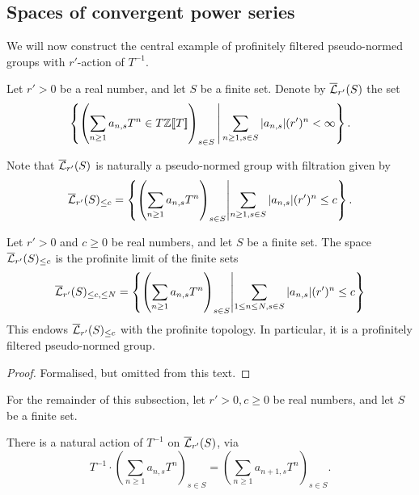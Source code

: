 \subsection{Spaces of convergent power series}

We will now construct the central example of
profinitely filtered pseudo-normed groups with $r'$-action of $T^{-1}$.

\begin{definition}
  \label{Lbar}
  \leanok
  Let $r' > 0$ be a real number, and let $S$ be a finite set.
  Denote by $\overline{\mathcal L}_{r'}(S)$ the set
  \[
    \left\{ \left( \sum_{n \ge 1} a_{n,s} T^n \in T\mathbb{Z}[\![T]\!]\right)_{s \in S} \,\middle\vert\, \sum_{n \ge 1, s \in S} |a_{n,s}| (r')^n < \infty \right\}.
  \]

  Note that $\overline{\mathcal L}_{r'}(S)$ is naturally a pseudo-normed group
  with filtration given by
  \[
    \overline{\mathcal L}_{r'}(S)_{\le c} =
    \left\{ \left( \sum_{n \ge 1} a_{n,s} T^n \right)_{s \in S} \middle\vert \sum_{n \ge 1, s \in S} |a_{n,s}| (r')^n \le c \right\}.
  \]
\end{definition}

\begin{lemma}
  \label{Lbar_profinitely_filtered}
  \leanok
  Let $r' > 0$ and $c \ge 0$ be real numbers, and let $S$ be a finite set.
  The space $\overline{\mathcal L}_{r'}(S)_{\le c}$ is the profinite limit of the finite sets
  \[
    \overline{\mathcal L}_{r'}(S)_{\le c, \le N} =
    \left\{ \left( \sum_{n \ge 1} a_{n,s} T^n \right)_{s \in S} \middle\vert
    \sum_{1 \le n \le N, s \in S} |a_{n,s}| (r')^n \le c \right\}
  \]
  This endows $\overline{\mathcal L}_{r'}(S)_{\le c}$ with the profinite topology.
  In particular, it is a profinitely filtered pseudo-normed group.
\end{lemma}

\begin{proof}
  \leanok
  Formalised, but omitted from this text.
\end{proof}

For the remainder of this subsection,
let $r' > 0, c \ge 0$ be real numbers,
and let $S$ be a finite set.

\begin{definition}
  \label{Lbar_Tinv}
  \leanok
  There is a natural action of $T^{-1}$ on $\overline{\mathcal L}_{r'}(S)$, via
  \[
    T^{-1} \cdot
    \left( \sum_{n \ge 1} a_{n,s} T^n \right)_{s \in S} =
    \left( \sum_{n \ge 1} a_{n+1,s} T^n \right)_{s \in S}.
  \]
\end{definition}


